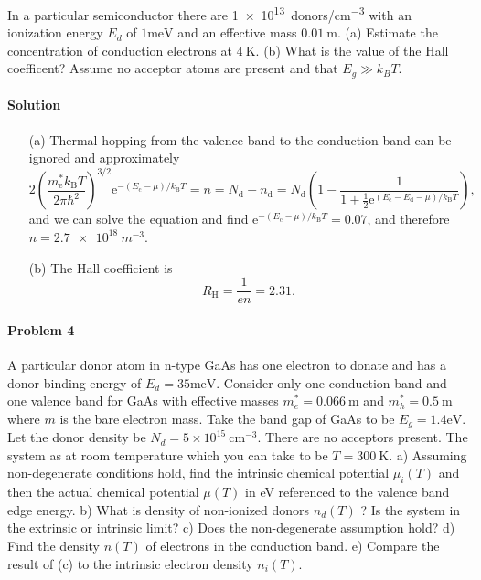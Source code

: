 \documentclass[hyperref, a4paper]{article}
\newcommand*{\ee}{\mathrm{e}}
\begin{document}
In a particular semiconductor there are \SI{1e13}{donors/cm^{-3}}
with an ionization energy $E_d$ of $1 \mathrm{meV}$ and an effective mass $0.01 \mathrm{~m}$. (a) Estimate the concentration of conduction electrons at $4 \mathrm{~K}$. (b) What is the value of the Hall coefficent? Assume no acceptor atoms are present and that $E_g \gg k_B T$.

\paragraph{Solution} \begin{itemize}
\item[(a)] Thermal hopping from the valence band to the conduction band can be ignored and 
approximately 
\begin{equation}
    2 \left( \frac{m_\text{e}^* k_{\text{B}} T}{2 \pi \hbar^2} \right)^{3/2} 
    \ee^{- (E_{\text{c}} - \mu) / k_{\text{B}} T} = n = N_{\text{d}} - n_{\text{d}} = N_{\text{d}} \left( 1 - 
    \frac{1}{ 1 + \frac{1}{2} \ee^{ (E_{\text{c}} - E_{\text{d}} - \mu) / k_{\text{B}} T } } \right) ,
\end{equation}
and we can solve the equation and find $\ee^{-(E_{\text{c}} - \mu) / k_{\text{B}} T} = 0.07$, 
and therefore $n = \SI{2.7e18}{m^{-3}}$.

\item[(b)] The Hall coefficient is 
\begin{equation}
    R_{\text{H}} = \frac{1}{en} = 2.31.
\end{equation}

\end{itemize}

\paragraph{Problem 4} A particular donor atom in n-type GaAs has one electron to donate and has a donor binding energy of $E_d=35 \mathrm{meV}$. Consider only one conduction band and one valence band for GaAs with effective masses $m_e^*=0.066 \mathrm{~m}$ and $m_h^*=0.5 \mathrm{~m}$ where $m$ is the bare electron mass. Take the band gap of GaAs to be $E_g=1.4 \mathrm{eV}$. Let the donor density be $N_d=5 \times 10^{15} \mathrm{~cm}^{-3}$. There are no acceptors present. The system as at room temperature which you can take to be $T=300 \mathrm{~K}$.
a) Assuming non-degenerate conditions hold, find the intrinsic chemical potential $\mu_i(T)$ and then the actual chemical potential $\mu(T)$ in eV referenced to the valence band edge energy.
b) What is density of non-ionized donors $n_d(T)$ ? Is the system in the extrinsic or intrinsic limit?
c) Does the non-degenerate assumption hold?
d) Find the density $n(T)$ of electrons in the conduction band.
e) Compare the result of (c) to the intrinsic electron density $n_i(T)$.
\end{document}
